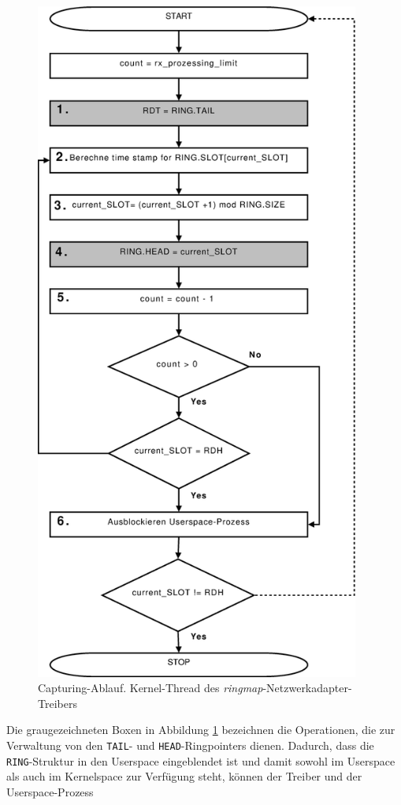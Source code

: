 %
\begin{figure}
\centering 
\includegraphics[width=4.2in]{bilder/FlowChart_New_Kernel_Thread}
\caption{Capturing-Ablauf. Kernel-Thread des \emph{ringmap}-Netzwerkadapter-Treibers}
\label{img:new_kernel_thread}
\end{figure}
Die graugezeichneten Boxen in Abbildung \ref{img:new_kernel_thread} bezeichnen
die Operationen, die zur Verwaltung von den \verb+TAIL+- und
\verb+HEAD+-Ringpointers dienen.  Dadurch, dass die \verb+RING+-Struktur in den
Userspace eingeblendet ist und damit sowohl im Userspace als auch im
Kernelspace zur Verfügung steht, können der Treiber und der Userspace-Prozess
